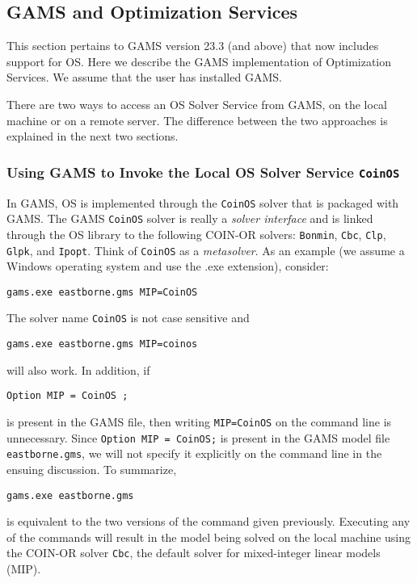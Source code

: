 


\subsection{GAMS and Optimization Services}\label{section:gamslinks}


This section pertains to GAMS version 23.3 (and above) that now includes support for OS.  
Here we describe the GAMS  implementation of Optimization Services.  We assume that the user has installed GAMS.

There are two ways to access an OS Solver Service from GAMS, on the local machine or on a remote server.
The difference between the two approaches is explained in the next two sections.

\subsubsection{Using GAMS to Invoke the Local OS Solver Service \tt CoinOS}\label{section:gamslocal}

   
In GAMS,  OS is implemented through the {\tt CoinOS} solver that is packaged with GAMS.      
The GAMS {\tt CoinOS} solver is really a {\it solver interface} and is linked through the OS library to the 
following COIN-OR solvers: {\tt Bonmin}, {\tt Cbc}, {\tt Clp},  {\tt Glpk}, and {\tt Ipopt}. 
Think of {\tt CoinOS} as a {\it metasolver}.    As an example (we assume a Windows operating system 
and use the .exe extension), consider:

\begin{verbatim}
gams.exe eastborne.gms MIP=CoinOS
\end{verbatim}
The solver name {\tt CoinOS} is not case sensitive and 
\begin{verbatim}
gams.exe eastborne.gms MIP=coinos
\end{verbatim}
will also work.  In addition, if
\begin{verbatim}
Option MIP = CoinOS ;
\end{verbatim}
is present in the GAMS file, then writing {\tt MIP=CoinOS} on the command line is unnecessary.
Since {\tt Option MIP = CoinOS;} is present in the GAMS model file {\tt eastborne.gms}, 
we will not specify it explicitly on the command line in the ensuing discussion. To summarize,
\begin{verbatim}
gams.exe eastborne.gms 
\end{verbatim}
is equivalent to the two versions of the command given previously.  Executing any of the commands will 
result in the model being solved on the local machine using the COIN-OR solver {\tt Cbc}, the default solver 
for 
mixed-integer linear models (MIP).


